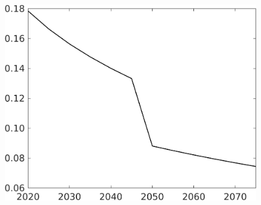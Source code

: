 \documentclass[12pt]{article}
\begin{document}
\begin{figure}[h!!]
\begin{minipage}[]{0.32\textwidth}
\end{minipage}		
\begin{minipage}[]{0.32\textwidth}
\includegraphics[width=1\textwidth]{../../codding_model/own_basedOnFried/optimalPol_010922_revision/figures/all_13Sept22/CompTaufPER_bytaul_Reg0_EY_spillover0_nsk0_xgr0_knspil0_sep1_LFlimit1_emsbase0_countec0_GovRev0_etaa0.79_lgd0.png}
\end{minipage}	
\end{figure}
\end{document}
